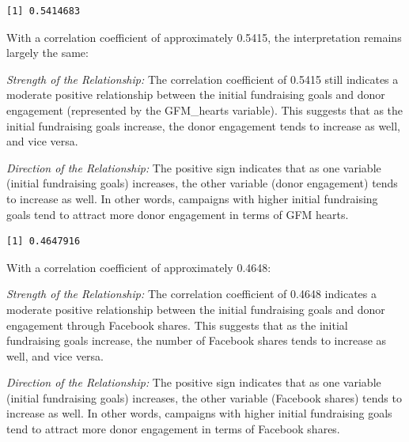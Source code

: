 \documentclass[
  letterpaper,
  DIV=11,
  numbers=noendperiod]{scrartcl}
\newenvironment{Shaded}{\begin{snugshade}}{\end{snugshade}}
\newcommand{\AttributeTok}[1]{\textcolor[rgb]{0.40,0.45,0.13}{#1}}
\newcommand{\CommentTok}[1]{\textcolor[rgb]{0.37,0.37,0.37}{#1}}
\newcommand{\FunctionTok}[1]{\textcolor[rgb]{0.28,0.35,0.67}{#1}}
\newcommand{\NormalTok}[1]{\textcolor[rgb]{0.00,0.23,0.31}{#1}}
\newcommand{\OtherTok}[1]{\textcolor[rgb]{0.00,0.23,0.31}{#1}}
\newcommand{\SpecialCharTok}[1]{\textcolor[rgb]{0.37,0.37,0.37}{#1}}
\newcommand{\StringTok}[1]{\textcolor[rgb]{0.13,0.47,0.30}{#1}}
\begin{document}
\begin{verbatim}
[1] 0.5414683
\end{verbatim}

With a correlation coefficient of approximately 0.5415, the
interpretation remains largely the same:

\emph{Strength of the Relationship:} The correlation coefficient of
0.5415 still indicates a moderate positive relationship between the
initial fundraising goals and donor engagement (represented by the
GFM\_hearts variable). This suggests that as the initial fundraising
goals increase, the donor engagement tends to increase as well, and vice
versa.

\emph{Direction of the Relationship:} The positive sign indicates that
as one variable (initial fundraising goals) increases, the other
variable (donor engagement) tends to increase as well. In other words,
campaigns with higher initial fundraising goals tend to attract more
donor engagement in terms of GFM hearts.

\begin{Shaded}
\end{Shaded}

\begin{verbatim}
[1] 0.4647916
\end{verbatim}

With a correlation coefficient of approximately 0.4648:

\emph{Strength of the Relationship:} The correlation coefficient of
0.4648 indicates a moderate positive relationship between the initial
fundraising goals and donor engagement through Facebook shares. This
suggests that as the initial fundraising goals increase, the number of
Facebook shares tends to increase as well, and vice versa.

\emph{Direction of the Relationship:} The positive sign indicates that
as one variable (initial fundraising goals) increases, the other
variable (Facebook shares) tends to increase as well. In other words,
campaigns with higher initial fundraising goals tend to attract more
donor engagement in terms of Facebook shares.
\end{document}
